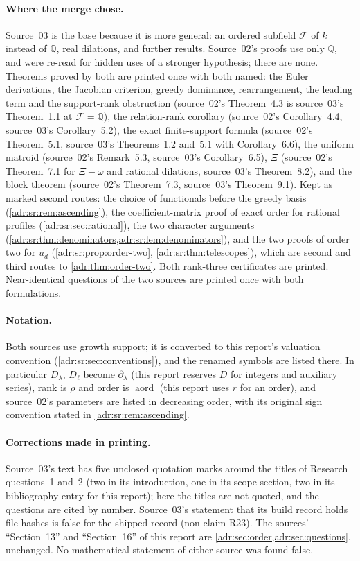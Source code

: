 \documentclass[11pt,letterpaper]{article}
\numberwithin{equation}{section}
\theoremstyle{definition}
\theoremstyle{remark}
\newcommand{\Q}{\mathbb Q}
\begin{document}
\paragraph{Where the merge chose.} Source~03 is the base because it is more
general: an ordered subfield $\mathcal F$ of $k$ instead of $\Q$, real
dilations, and further results. Source~02's proofs use only $\Q$, and were
re-read for hidden uses of a stronger hypothesis; there are none. Theorems
proved by both are printed once with both named: the Euler derivations, the
Jacobian criterion, greedy dominance, rearrangement, the leading term and the
support-rank obstruction (source~02's Theorem~4.3 is source~03's
Theorem~1.1 at $\mathcal F=\Q$), the relation-rank corollary (source~02's
Corollary~4.4, source~03's Corollary~5.2), the exact finite-support formula
(source~02's Theorem~5.1, source~03's Theorems~1.2 and~5.1 with
Corollary~6.6), the uniform matroid (source~02's Remark~5.3, source~03's
Corollary~6.5), $\Xi$ (source~02's Theorem~7.1 for $\Xi-\omega$ and rational
dilations, source~03's Theorem~8.2), and the block theorem (source~02's
Theorem~7.3, source~03's Theorem~9.1). Kept as marked second routes: the
choice of functionals before the greedy basis
(\cref{adr:sr:rem:ascending}), the coefficient-matrix proof of exact order
for rational profiles (\cref{adr:sr:sec:rational}), the two character
arguments (\cref{adr:sr:thm:denominators,adr:sr:lem:denominators}), and the
two proofs of order two for $u_d$ (\cref{adr:sr:prop:order-two},
\cref{adr:sr:thm:telescopes}), which are second and third routes to
\cref{adr:thm:order-two}. Both rank-three certificates are printed. Near-identical
questions of the two sources are printed once with both formulations.

\paragraph{Notation.} Both sources use growth support; it is converted to this
report's valuation convention (\cref{adr:sr:sec:conventions}), and the renamed
symbols are listed there. In particular $D_\lambda$, $D_\ell$ become
$\partial_\lambda$ (this report reserves $D$ for integers and auxiliary
series), rank is $\rho$ and order is $\operatorname{aord}$ (this report uses
$r$ for an order), and source~02's parameters are listed in decreasing order,
with its original sign convention stated in \cref{adr:sr:rem:ascending}.

\paragraph{Corrections made in printing.} Source~03's text has five
unclosed quotation marks around the titles of Research questions~1 and~2 (two
in its introduction, one in its scope section, two in its bibliography entry
for this report); here the titles are not quoted, and the questions are cited
by number. Source~03's statement that its build record holds file hashes is
false for the shipped record (non-claim R23). The sources' ``Section~13'' and
``Section~16'' of this report are \cref{adr:sec:order,adr:sec:questions},
unchanged. No mathematical statement of either source was found false.
\end{document}

